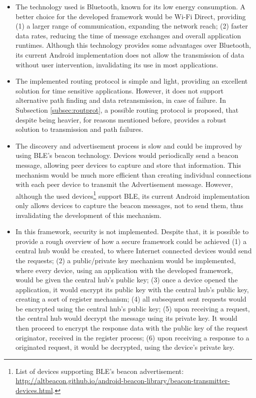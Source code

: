 \begin{itemize}
	\item The technology used is Bluetooth, known for its low energy consumption. A better choice for the developed framework would be Wi-Fi Direct, providing (1) a larger range of communication, expanding the network reach; (2) faster data rates, reducing the time of message exchanges and overall application runtimes. Although this technology provides some advantages over Bluetooth, its current Android implementation does not allow the transmission of data without user intervention, invalidating its use in most applications.
	
	\item The implemented routing protocol is simple and light, providing an excellent solution for time sensitive applications. However, it does not support alternative path finding and data retransmission, in case of failure. In Subsection \ref{subsec:routprot}, a possible routing protocol is proposed, that despite being heavier, for reasons mentioned before, provides a robust solution to transmission and path failures.
	
	\item The discovery and advertisement process is slow and could be improved by using \gls{BLE}'s beacon technology. Devices would periodically send a beacon message, allowing peer devices to capture and store that information. This mechanism would be much more efficient than creating individual connections with each peer device to transmit the Advertisement message. However, although the used devices\footnote{List of devices supporting \gls{BLE}'s beacon advertisement: \url{http://altbeacon.github.io/android-beacon-library/beacon-transmitter-devices.html}.} support \gls{BLE}, its current Android implementation only allows devices to capture the beacon messages, not to send them, thus invalidating the development of this mechanism.
	
	\item In this framework, security is not implemented. Despite that, it is possible to provide a rough overview of how a secure framework could be achieved (1) a central hub would be created, to where Internet connected devices would send the requests; (2) a public/private key mechanism would be implemented, where every device, using an application with the developed framework, would be given the central hub's public key; (3) once a device opened the application, it would encrypt its public key with the central hub's public key, creating a sort of register mechanism; (4) all subsequent sent requests would be encrypted using the central hub's public key; (5) upon receiving a request, the central hub would decrypt the message using its private key. It would then proceed to encrypt the response data with the public key of the request originator, received in the register process; (6) upon receiving a response to a originated request, it would be decrypted, using the device's private key.
	

\end{itemize}
